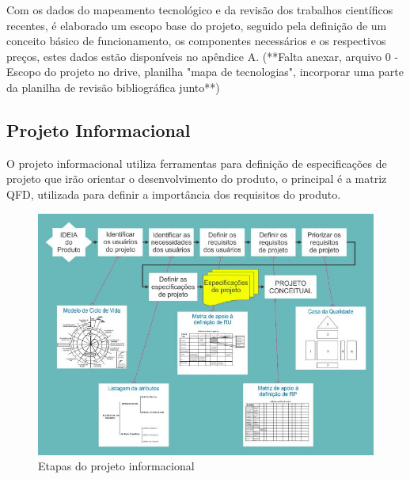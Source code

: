 
Com os dados do mapeamento tecnológico e da revisão dos trabalhos científicos recentes, é elaborado um escopo base do projeto, seguido pela definição de um conceito básico de funcionamento, os componentes necessários e os respectivos preços, estes dados estão disponíveis no apêndice A. (**Falta anexar, arquivo 0 - Escopo do projeto no drive, planilha "mapa de tecnologias", incorporar uma parte da planilha de revisão bibliográfica junto**)

\subsection{Projeto Informacional}

O projeto informacional utiliza ferramentas para definição de especificações de projeto que irão orientar o desenvolvimento do produto, o principal é a matriz QFD, utilizada para definir a importância dos requisitos do produto.

\begin{figure}[htb]
	\caption{\label{fig:Fig_401}Etapas do projeto informacional}
	\begin{center}
		\includegraphics[width=\textwidth]{images/img402.jpg}
	\end{center}
\end{figure}

